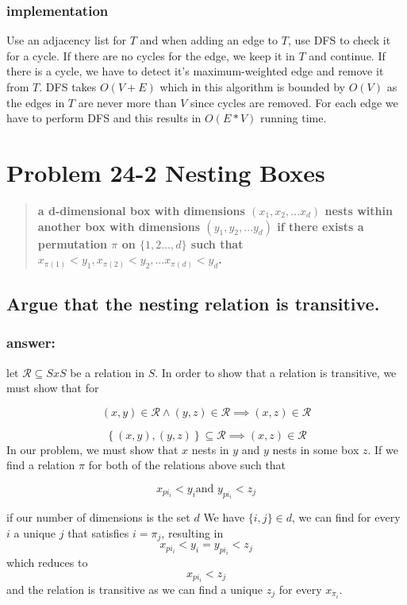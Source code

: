 \documentclass[titlepage]{article}
\theoremstyle{definition}
\begin{document}
  \subsubsection{implementation}
  Use an adjacency list for $T$ and when adding an edge to $T$, use DFS to
  check it for a cycle. If there are no cycles for the edge, we keep it in 
  $T$ and continue. If there is a cycle, we have to detect it's
  maximum-weighted edge and remove it from $T$. DFS takes $O(V+E)$ which in
  this algorithm is bounded by $O(V)$ as the edges in $T$ are never more than
  $V$ since cycles are removed. For each edge we have to perform DFS and this
  results in $O(E*V)$ running time. 



\section{Problem 24-2 Nesting Boxes}
  \begin{quote}
    \textbf{a d-dimensional box with dimensions $(x_1, x_2, \dots x_d)$
    \textbf{nests} within another box with dimensions $(y_1, y_2, \dots y_d)$
    if there exists a permutation $\pi$ on $\{1,2\dots,d\}$ such that 
    $ x_{\pi(1)} < y_1, x_{\pi(2)} < y_2, \dots x_{\pi(d)} < y_d$.  }
  \end{quote}

  \subsection{Argue that the nesting relation is transitive.}
    \subsubsection{answer:}
      let $\mathcal R \subseteq S x S$ be a relation in $S$. 
      In order to show that a relation is transitive, we must show that  for

      \[ \left({x, y}\right) \in \mathcal R \land \left({y, z}\right) \in \mathcal R \implies \left({x, z}\right) \in \mathcal R \]

      \[ \left\{ {\left({x, y}\right), \left({y, z}\right)}\right\} \subseteq \mathcal R \implies \left({x, z}\right) \in \mathcal R \]
      In our problem, we must show that $x$ nests in $y$ and $y$ nests in some box
      $z$. If we find a relation $\pi$ for both of the relations above such that

      \[ x_{pi_i} < y_i \text{and } y_{pi_i} < z_j \]

      if our number of dimensions is the set $d$
      We have $ \{i,j\} \in d$, we can find for every $i$ a unique $j$ that satisfies
      $i = \pi_j$, resulting in 
      \[ x_{pi_i} < y_i =  y_{pi_i} < z_j \]
      which reduces to 
      \[ x_{pi_i} < z_j \]
      and the relation is transitive as we can find a unique $z_j$ for every
      $x_{\pi_i}$.
\end{document}
